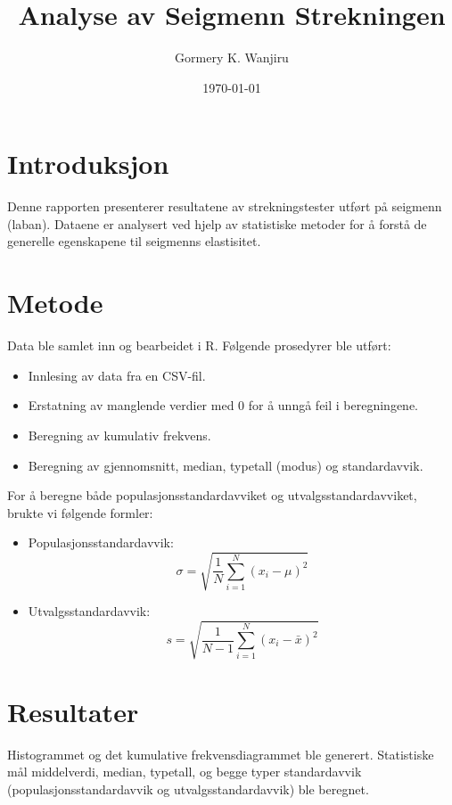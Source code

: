 \documentclass{article}
\begin{document}
\title{Analyse av Seigmenn Strekningen}
\author{Gormery K. Wanjiru}
\date{\today}
\maketitle

\section{Introduksjon}
Denne rapporten presenterer resultatene av strekningstester utført på seigmenn (laban). Dataene er analysert ved hjelp av statistiske metoder for å forstå de generelle egenskapene til seigmenns elastisitet.

\section{Metode}
Data ble samlet inn og bearbeidet i R. Følgende prosedyrer ble utført:
\begin{itemize}
    \item Innlesing av data fra en CSV-fil.
    \item Erstatning av manglende verdier med 0 for å unngå feil i beregningene.
    \item Beregning av kumulativ frekvens.
    \item Beregning av gjennomsnitt, median, typetall (modus) og standardavvik.
\end{itemize}

For å beregne både populasjonsstandardavviket og utvalgsstandardavviket, brukte vi følgende formler:
\begin{itemize}
    \item Populasjonsstandardavvik: 
    \[
    \sigma = \sqrt{\frac{1}{N}\sum_{i=1}^{N}(x_i - \mu)^2}
    \]
    \item Utvalgsstandardavvik: 
    \[
    s = \sqrt{\frac{1}{N-1}\sum_{i=1}^{N}(x_i - \bar{x})^2}
    \]
\end{itemize}

\section{Resultater}
Histogrammet og det kumulative frekvensdiagrammet ble generert. Statistiske mål middelverdi, median, typetall, og begge typer standardavvik (populasjonsstandardavvik og utvalgsstandardavvik) ble beregnet.
\end{document}
